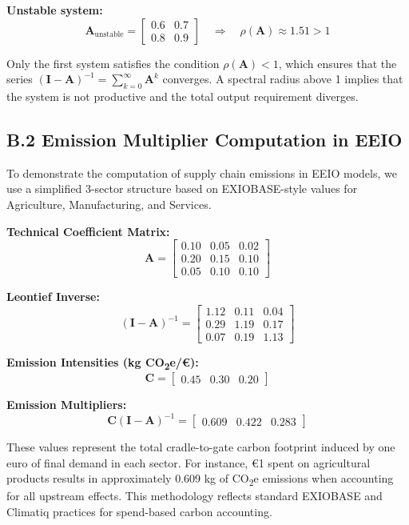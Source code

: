 \documentclass[12pt,a4paper]{article}%
\begin{document}
\textbf{Unstable system:}
\[
\mathbf{A}_{\text{unstable}} =
\begin{bmatrix}
0.6 & 0.7 \\
0.8 & 0.9
\end{bmatrix}
\quad \Rightarrow \quad \rho(\mathbf{A}) \approx 1.51 > 1
\]

Only the first system satisfies the condition \( \rho(\mathbf{A}) < 1 \), which ensures that the series \( (\mathbf{I} - \mathbf{A})^{-1} = \sum_{k=0}^\infty \mathbf{A}^k \) converges. A spectral radius above 1 implies that the system is not productive and the total output requirement diverges.

\subsection*{B.2 Emission Multiplier Computation in EEIO}

To demonstrate the computation of supply chain emissions in EEIO models, we use a simplified 3-sector structure based on EXIOBASE-style values for Agriculture, Manufacturing, and Services.

\textbf{Technical Coefficient Matrix:}
\[
\mathbf{A} =
\begin{bmatrix}
0.10 & 0.05 & 0.02 \\
0.20 & 0.15 & 0.10 \\
0.05 & 0.10 & 0.10
\end{bmatrix}
\]

\textbf{Leontief Inverse:}
\[
(\mathbf{I} - \mathbf{A})^{-1} =
\begin{bmatrix}
1.12 & 0.11 & 0.04 \\
0.29 & 1.19 & 0.17 \\
0.07 & 0.19 & 1.13
\end{bmatrix}
\]

\textbf{Emission Intensities (kg CO\textsubscript{2}e/€):}
\[
\mathbf{C} = \begin{bmatrix} 0.45 & 0.30 & 0.20 \end{bmatrix}
\]

\textbf{Emission Multipliers:}
\[
\mathbf{C} (\mathbf{I} - \mathbf{A})^{-1} =
\begin{bmatrix}
0.609 & 0.422 & 0.283
\end{bmatrix}
\]

These values represent the total cradle-to-gate carbon footprint induced by one euro of final demand in each sector. For instance, €1 spent on agricultural products results in approximately 0.609 kg of CO\textsubscript{2}e emissions when accounting for all upstream effects. This methodology reflects standard EXIOBASE and Climatiq practices for spend-based carbon accounting.
\end{document}
